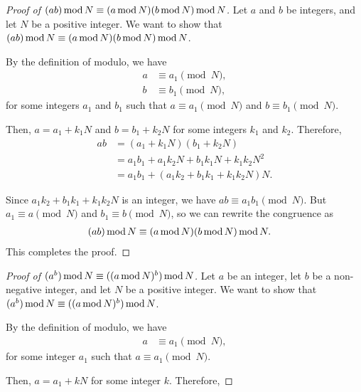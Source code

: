 \documentclass[12pt,openany]{book}
\theoremstyle{definition}
\renewcommand{\mod}{\operatorname{\textnormal{mod}}}
\begin{document}
	\newpage
	\begin{proof}[Proof of $(ab) \mod N \equiv (a \mod N)(b \mod N) \mod N$]
		Let $a$ and $b$ be integers, and let $N$ be a positive integer. We want to show that $(ab) \mod N \equiv (a \mod N)(b \mod N) \mod N$.
		
		By the definition of modulo, we have
		\begin{align*}
		a &\equiv a_1 \pmod{N}, \\
		b &\equiv b_1 \pmod{N},
		\end{align*}
		for some integers $a_1$ and $b_1$ such that $a \equiv a_1 \pmod{N}$ and $b \equiv b_1 \pmod{N}$.
		
		Then, $a = a_1 + k_1N$ and $b = b_1 + k_2N$ for some integers $k_1$ and $k_2$. Therefore,
		\begin{align*}
		ab &= (a_1 + k_1N)(b_1 + k_2N) \\
		&= a_1b_1 + a_1k_2N + b_1k_1N + k_1k_2N^2 \\
		&= a_1b_1 + (a_1k_2 + b_1k_1 + k_1k_2N)N.
		\end{align*}
		
		Since $a_1k_2 + b_1k_1 + k_1k_2N$ is an integer, we have $ab \equiv a_1b_1 \pmod{N}$. But $a_1 \equiv a \pmod{N}$ and $b_1 \equiv b \pmod{N}$, so we can rewrite the congruence as
		\begin{align*}
		(ab) \mod N &\equiv (a \mod N)(b \mod N) \mod N.
		\end{align*}
		This completes the proof.
	\end{proof}
	
	\begin{proof}[Proof of $(a^b) \mod N \equiv ((a \mod N)^b) \mod N$]
		Let $a$ be an integer, let $b$ be a non-negative integer, and let $N$ be a positive integer. We want to show that $(a^b) \mod N \equiv ((a \mod N)^b) \mod N$.
		
		By the definition of modulo, we have
		\begin{align*}
		a &\equiv a_1 \pmod{N},
		\end{align*}
		for some integer $a_1$ such that $a \equiv a_1 \pmod{N}$.
		
		Then, $a = a_1 + kN$ for some integer $k$. Therefore,
	\end{proof}
	
\end{document}
